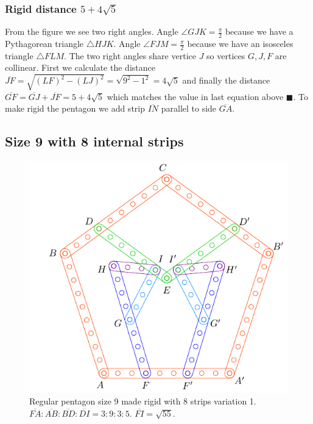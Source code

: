 \documentclass[11pt]{article}
\begin{document}
\subsubsection{Rigid distance $5 + 4\sqrt5$}

From the figure we see two right angles. Angle $\angle{GJK}=\frac{\pi}2$ because we have a Pythagorean triangle $\triangle{HJK}$. Angle $\angle{FJM}=\frac{\pi}2$ because we have an isosceles triangle $\triangle{FLM}$. The two right angles share vertice $J$ so vertices $G,J,F$ are collinear. First we calculate the distance $\overline{JF} = \sqrt{(LF)^2 - (LJ)^2} = \sqrt{9^2-1^2} = 4\sqrt5$ and finally the distance $\overline{GF} = \overline{GJ} + \overline{JF} = 5 + 4\sqrt5$ which matches the value in last equation above $\blacksquare$. To make rigid the pentagon we add strip $\overline{IN}$ parallel to side $\overline{GA}$.

\subsection{Size 9 with 8 internal strips}

\begin{figure}[H]
 \centering
 \includegraphics[scale=0.95]{9/penta9-8a}
 \caption{Regular pentagon size 9 made rigid with 8 strips variation 1. $\overline{FA}:\overline{AB}:\overline{BD}:\overline{DI} = 3:9:3:5$. $\overline{FI} = \sqrt{55}$.}
 \label{fig:penta9-8a}
\end{figure}
\end{document}

